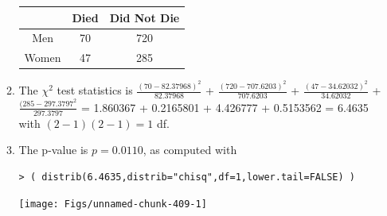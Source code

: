 \documentclass[10pt,openany]{book}\usepackage[]{graphicx}\usepackage[]{color}
\makeatletter
\newenvironment{kframe}{%
 \def\at@end@of@kframe{}%
 \ifinner\ifhmode%
  \def\at@end@of@kframe{\end{minipage}}%
  \begin{minipage}{\columnwidth}%
 \fi\fi%
 \def\FrameCommand##1{\hskip\@totalleftmargin \hskip-\fboxsep
 \colorbox{shadecolor}{##1}\hskip-\fboxsep
     \hskip-\linewidth \hskip-\@totalleftmargin \hskip\columnwidth}%
 \MakeFramed {\advance\hsize-\width
   \@totalleftmargin\z@ \linewidth\hsize
   \@setminipage}}%
 {\par\unskip\endMakeFramed%
 \at@end@of@kframe}
\newenvironment{knitrout}{}{} %
\makeatother
\begin{document}
\begin{itemize}
\begin{enumerate}
\begin{center}
\begin{tabular}{|c|c|c|}
             & Died & Did Not Die \\
            \hline
            Men & 70 & 720 \\
            \hline
            Women & 47 & 285 \\
            \hline\hline
          \end{tabular}
        \end{center}
      \item The $\chi^{2}$ test statistics is $\frac{(70-82.37968)^{2}}{82.37968}$ + $\frac{(720-707.6203)^{2}}{707.6203}$ + $\frac{(47-34.62032)^{2}}{34.62032}$ + $\frac{(285-297.3797^{2}}{297.3797}$ = 1.860367 + 0.2165801 + 4.426777 + 0.5153562 = 6.4635 with $(2-1)(2-1)=1$ df.
      \item The p-value is $p=0.0110$, as computed with
\begin{knitrout}
\color{fgcolor}\begin{kframe}
\begin{verbatim}
> ( distrib(6.4635,distrib="chisq",df=1,lower.tail=FALSE) )
\end{verbatim}


{\ttfamily\noindent\bfseries\color{errorcolor}{Error in plot.window(...): need finite 'ylim' values}}\end{kframe}

{\centering \texttt{[image: Figs/unnamed-chunk-409-1]} 

}




\end{knitrout}
\end{enumerate}
\end{itemize}
\end{document}
